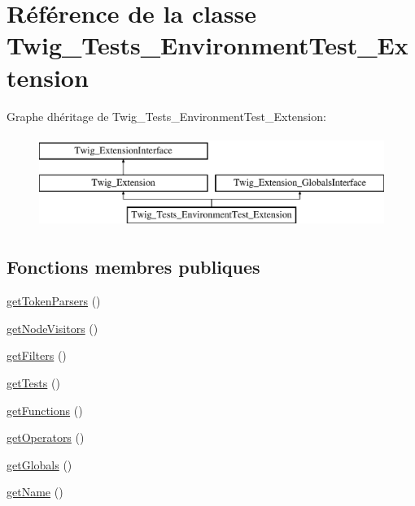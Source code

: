 \hypertarget{class_twig___tests___environment_test___extension}{}\section{Référence de la classe Twig\+\_\+\+Tests\+\_\+\+Environment\+Test\+\_\+\+Extension}
\label{class_twig___tests___environment_test___extension}
Graphe d\textquotesingle{}héritage de Twig\+\_\+\+Tests\+\_\+\+Environment\+Test\+\_\+\+Extension\+:\begin{figure}[H]
\begin{center}
\leavevmode
\includegraphics[height=3.000000cm]{class_twig___tests___environment_test___extension}
\end{center}
\end{figure}
\subsection*{Fonctions membres publiques}
\begin{DoxyCompactItemize}
\item 
\hyperlink{class_twig___tests___environment_test___extension_a8fd35903c3d01c0f0078f59d142eb063}{get\+Token\+Parsers} ()
\item 
\hyperlink{class_twig___tests___environment_test___extension_aec02093179d390d22ae4083f23a1d74a}{get\+Node\+Visitors} ()
\item 
\hyperlink{class_twig___tests___environment_test___extension_a428d91319fc73d3038784cf5436936b6}{get\+Filters} ()
\item 
\hyperlink{class_twig___tests___environment_test___extension_a7e247dd31cc8d37a6c97353a062a0080}{get\+Tests} ()
\item 
\hyperlink{class_twig___tests___environment_test___extension_a131c2522f07821f77cd1d038c216031b}{get\+Functions} ()
\item 
\hyperlink{class_twig___tests___environment_test___extension_aeaf58da661970280d00b67c17dc4f8d4}{get\+Operators} ()
\item 
\hyperlink{class_twig___tests___environment_test___extension_ae3a26252ce6efe503698085a7ed69dad}{get\+Globals} ()
\item 
\hyperlink{class_twig___tests___environment_test___extension_a3d0963e68bb313b163a73f2803c64600}{get\+Name} ()
\end{DoxyCompactItemize}


